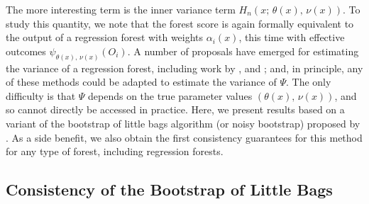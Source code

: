 \documentclass[aos]{imsart}
\theoremstyle{plain}
\theoremstyle{definition}
\theoremstyle{remark}
\begin{document}
\begin{CJK}{UTF8}{gbsn}
{The more interesting term is the inner variance term $H_n(x; \, \theta(x), \, \nu(x))$. To
study this quantity, we note that the forest score
is again formally equivalent to the output of a regression forest with weights
$\alpha_i(x)$, this time with effective outcomes $\psi_{\theta(x), \, \nu(x)}(O_i)$.
A number of proposals have emerged for estimating the variance of a regression
forest, including work by \citet{sexton2009standard}, \citet{mentch2016quantifying}
and \citet{wager2014confidence}; and, in principle, any of these methods could be
adapted to estimate the variance of $\Psi$. The only difficulty is that $\Psi$ depends
on the true parameter values $(\theta(x), \, \nu(x))$, and so cannot directly be
accessed in practice.
Here, we present results based on a variant of the bootstrap of little bags algorithm (or noisy bootstrap) proposed
by \citet{sexton2009standard}. As a side benefit, we also obtain the first consistency guarantees for
this method for any type of forest, including regression forests.


\subsection{Consistency of the Bootstrap of Little Bags}
\label{sec:blb}

}
\end{CJK}
\end{document}
